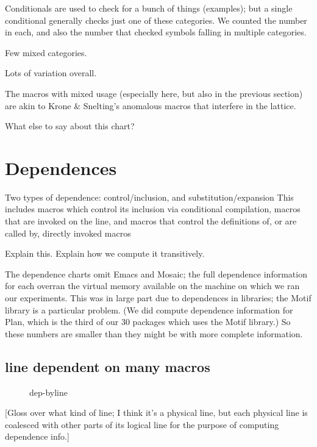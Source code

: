 \documentclass[10pt]{article}
\begin{document}
    Conditionals are used to check for a bunch of things (examples); but a
      single conditional generally checks just one of these categories.  We
      counted the number in each, and also the number that checked symbols
      falling in multiple categories.

    Few mixed categories.

    Lots of variation overall.

    The macros with mixed usage (especially here, but also in the previous
      section) are akin to Krone \& Snelting's anomalous macros that
      interfere in the lattice.

    What else to say about this chart?


{}


\section{Dependences}

 Two types of dependence:  control/inclusion, and substitution/expansion
     This includes macros which control its inclusion via conditional
     compilation, macros that are invoked on the line, and macros that
     control the definitions of, or are called by, directly invoked macros

 Explain this.  Explain how we compute it transitively.

 The dependence charts omit Emacs and Mosaic; the full dependence
   information for each overran the virtual memory available on the machine
   on which we ran our experiments.  This was in large part due to
   dependences in libraries; the Motif library is a particular problem.
   (We did compute dependence information for Plan, which is
   the third of our 30 packages which uses the Motif library.)  So these
   numbers are smaller than they might be with more complete information.

\subsection{line dependent on many macros}

\begin{figure}
\centerline{}
\caption{dep-byline}
\label{fig:dep-byline}
\end{figure}


    [Gloss over what kind of line; I think it's a physical line, but each
      physical line is coalesced with other parts of its logical line for
      the purpose of computing dependence info.]
\end{document}
